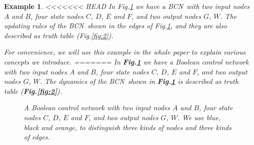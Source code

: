 \documentclass[conference]{IEEEtran} %
\newtheorem{example}{Example}
\def \BCN {{\em BCN}}
\begin{document}
\begin{example}
<<<<<<< HEAD
	In {\em  Fig.\ref{fig:1}} we have a \BCN\ with two input nodes $A$ and $B$, four state nodes $C$, $D$, $E$ and $F$, and two output nodes $G$, $W$. The updating rules of the \BCN\ shown in the edges of {\em Fig.\ref{fig:1}}, and they are also described as truth table ({\em Fig.\ref{fig:2}}). 
	
	For convenience, we will use this example in the whole paper to explain various concepts we introduce.
=======
	In {\bf Fig.\ref{fig:1}} we have a Boolean control network with two input nodes $A$ and $B$, four state nodes $C$, $D$, $E$ and $F$, and two output nodes $G$, $W$. The dynamics of the \BCN\ shown in {\bf Fig.\ref{fig:1}} is described as truth table ({\bf Fig.\ref{fig:2}}).
 
  
 \begin{figure}[thpb]
 	\centering
 	
 	\caption{A Boolean control network with two input nodes $A$ and $B$, four state nodes $C$, $D$, $E$ and $F$, and two output nodes $G$, $W$. We use blue, black and orange, to distinguish three kinds of nodes and three kinds of edges.}
 	\label{fig:1}
 \end{figure}
 

\end{example}
\end{document}
